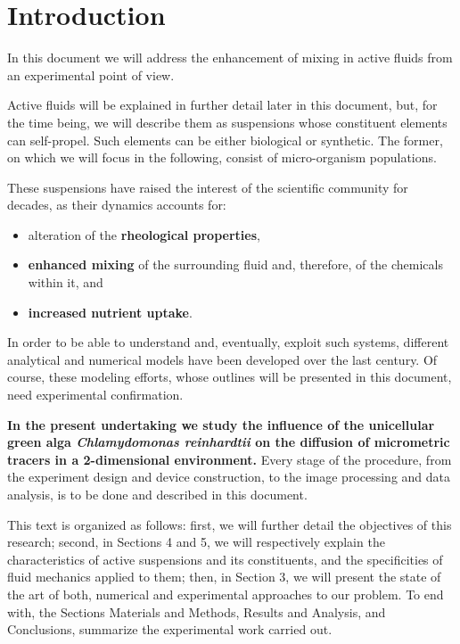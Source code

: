 \chapter{Introduction}
\label{introduction}

In this document we will address the enhancement of mixing in active fluids from an experimental point of view. 

Active fluids will be explained in further detail later in this document, but, for the time being, we will describe them as suspensions whose constituent elements can self-propel. Such elements can be either biological or synthetic. The former, on which we will focus in the following, consist of micro-organism populations.

These suspensions have raised the interest of the scientific community for decades, as their dynamics accounts for:

\begin{itemize}
	\item alteration of the \textbf{rheological properties},
	\item \textbf{enhanced mixing} of the surrounding fluid and, therefore, of the chemicals within it, and
	\item \textbf{increased nutrient uptake}.
\end{itemize}

In order to be able to understand and, eventually, exploit such systems, different analytical and numerical models have been developed over the last century. Of course, these modeling efforts, whose outlines will be presented in this document, need experimental confirmation.

\textbf{In the present undertaking we study the influence of the unicellular green alga \textit{Chlamydomonas reinhardtii} on the diffusion of micrometric tracers in a 2-dimensional environment.} 
Every stage of the procedure, from the experiment design and device construction, to the image processing and data analysis, is to be done and described in this document.

This text is organized as follows: first, we will further detail the objectives of this research; second,  in Sections 4 and 5, we will respectively explain the characteristics of active suspensions and its constituents, and the specificities of fluid mechanics applied to them; then, in Section 3, we will present the state of the art of both, numerical and experimental approaches to our problem. To end with, the Sections Materials and Methods, Results and Analysis, and Conclusions, summarize the experimental work carried out. 